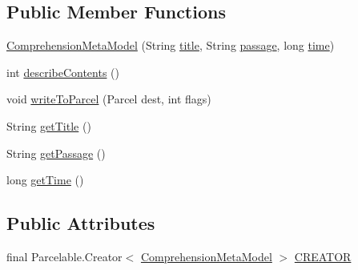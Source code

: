 \subsection*{Public Member Functions}
\begin{DoxyCompactItemize}
\item 
\hyperlink{classorg_1_1buildmlearn_1_1comprehension_1_1data_1_1ComprehensionMetaModel_a699e7a68c922085b1dfbbc99d4e90340}{Comprehension\+Meta\+Model} (String \hyperlink{classorg_1_1buildmlearn_1_1comprehension_1_1data_1_1ComprehensionMetaModel_a7477c70ed310977d2940c96e79102c6d}{title}, String \hyperlink{classorg_1_1buildmlearn_1_1comprehension_1_1data_1_1ComprehensionMetaModel_a1428aaa8205ac28da21b07937d134b3a}{passage}, long \hyperlink{classorg_1_1buildmlearn_1_1comprehension_1_1data_1_1ComprehensionMetaModel_a33312b86ddcb88ad1f4c150e9c033643}{time})
\item 
int \hyperlink{classorg_1_1buildmlearn_1_1comprehension_1_1data_1_1ComprehensionMetaModel_a6fd91b93585e93753d921ae11b9c66ab}{describe\+Contents} ()
\item 
void \hyperlink{classorg_1_1buildmlearn_1_1comprehension_1_1data_1_1ComprehensionMetaModel_a2941ca4d182e27ac990189f2375c2ddb}{write\+To\+Parcel} (Parcel dest, int flags)
\item 
String \hyperlink{classorg_1_1buildmlearn_1_1comprehension_1_1data_1_1ComprehensionMetaModel_aab5cc4ad87dee4c0c5b745f554e360c5}{get\+Title} ()
\item 
String \hyperlink{classorg_1_1buildmlearn_1_1comprehension_1_1data_1_1ComprehensionMetaModel_af4aa55f66aba25663bfe0a1fd8922102}{get\+Passage} ()
\item 
long \hyperlink{classorg_1_1buildmlearn_1_1comprehension_1_1data_1_1ComprehensionMetaModel_aa427a1738e82f86748b28cc37f2e5c54}{get\+Time} ()
\end{DoxyCompactItemize}
\subsection*{Public Attributes}
\begin{DoxyCompactItemize}
\item 
final Parcelable.\+Creator$<$ \hyperlink{classorg_1_1buildmlearn_1_1comprehension_1_1data_1_1ComprehensionMetaModel}{Comprehension\+Meta\+Model} $>$ \hyperlink{classorg_1_1buildmlearn_1_1comprehension_1_1data_1_1ComprehensionMetaModel_a5f2b2b04f3324bbeec1d443f03291383}{C\+R\+E\+A\+T\+OR}
\end{DoxyCompactItemize}
